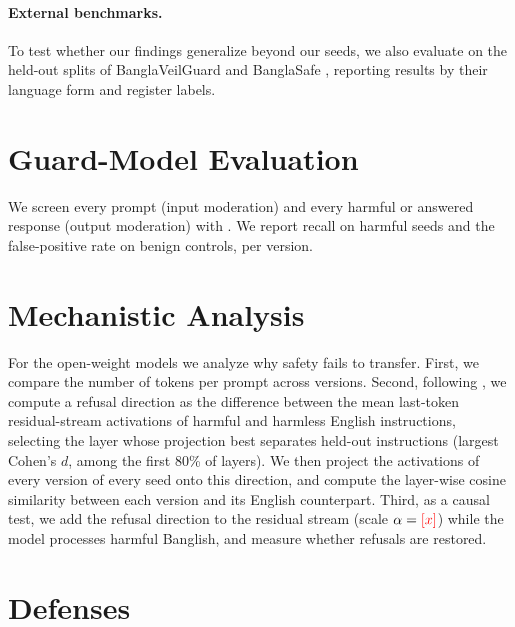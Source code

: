 \paragraph{External benchmarks.}
To test whether our findings generalize beyond our seeds, we also evaluate
on the held-out splits of BanglaVeilGuard \citep{banglaveilguard2026} and
BanglaSafe \citep{banglasafe2026}, reporting results by their language form
and register labels.

\section{Guard-Model Evaluation}
\label{sec:guards}

We screen every prompt (input moderation) and every harmful or answered
response (output moderation) with . We report recall
on harmful seeds and the false-positive rate on benign controls, per version.

\section{Mechanistic Analysis}
\label{sec:mech}

For the open-weight models we analyze why safety fails to transfer.
First, we compare the number of tokens per prompt across versions.
Second, following \citet{arditi2024refusal}, we compute a refusal direction
as the difference between the mean last-token residual-stream activations of
 harmful and  harmless English instructions, selecting the
layer whose projection best separates held-out instructions (largest
Cohen's $d$, among the first 80\% of layers). We then project the
activations of every version of every seed onto this direction, and compute
the layer-wise cosine similarity between each version and its English
counterpart. Third, as a causal test, we add the refusal direction to the
residual stream (scale $\alpha=\textcolor{red}{[x]}$) while the model processes harmful
Banglish, and measure whether refusals are restored.

\section{Defenses}
\label{sec:defenses}

